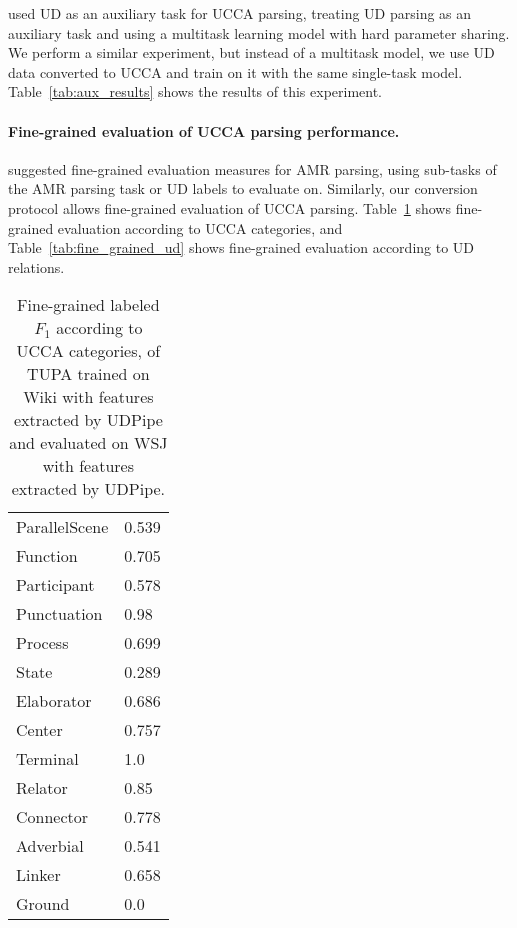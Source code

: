 \documentclass[11pt,a4paper]{article}
\begin{document}
 used UD as an auxiliary task for UCCA parsing,
treating UD parsing as an auxiliary task and using a multitask learning model
with hard parameter sharing.
We perform a similar experiment, but instead of a multitask model,
we use UD data converted to UCCA and train on it with the same single-task model.
Table~\ref{tab:aux_results} shows the results of this experiment.

\paragraph{Fine-grained evaluation of UCCA parsing performance.}

 suggested fine-grained evaluation measures
for AMR parsing, using sub-tasks of the AMR parsing task or UD labels to evaluate on.
Similarly, our conversion protocol allows fine-grained evaluation of UCCA parsing.
Table~\ref{tab:fine_grained_ucca} shows fine-grained evaluation according to UCCA categories, and
Table~\ref{tab:fine_grained_ud} shows fine-grained evaluation according to UD relations.


\begin{table}[t]
\centering
\small
\setlength\tabcolsep{3pt}
\begin{tabular}{l|l}
ParallelScene & 0.539 \\ 
Function & 0.705 \\ 
Participant & 0.578 \\ 
Punctuation & 0.98 \\ 
Process & 0.699 \\ 
State & 0.289 \\ 
Elaborator & 0.686 \\ 
Center & 0.757 \\ 
Terminal & 1.0 \\ 
Relator & 0.85 \\ 
Connector & 0.778 \\ 
Adverbial & 0.541 \\ 
Linker & 0.658 \\ 
Ground & 0.0
\end{tabular}
\caption{
Fine-grained labeled $F_1$ according to UCCA categories,
of TUPA trained on Wiki with features extracted by UDPipe
and evaluated on WSJ with features extracted by UDPipe.}
\label{tab:fine_grained_ucca}
\end{table}
\end{document}
